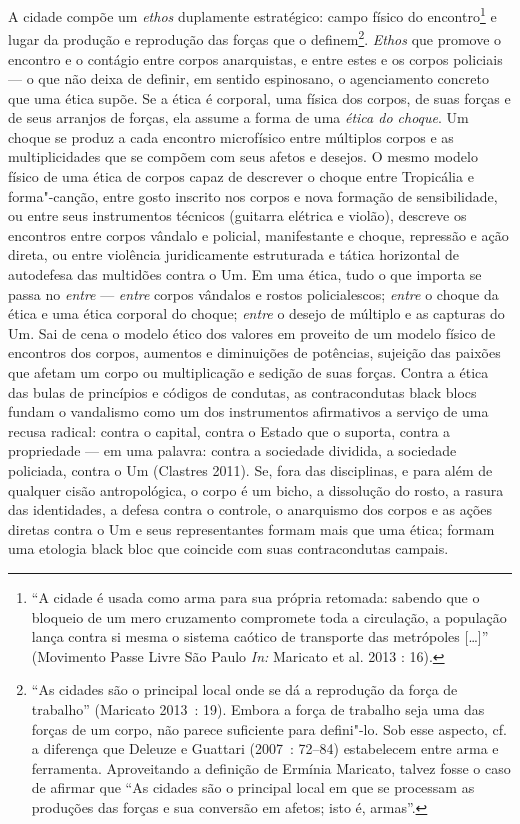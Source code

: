 A cidade compõe um \emph{ethos }duplamente estratégico: campo
físico do encontro\footnote{``A cidade é usada como
  arma para sua própria retomada: sabendo que o bloqueio de um mero
  cruzamento compromete toda a circulação, a população lança contra si
  mesma o sistema caótico de transporte das metrópoles {[}\ldots{}{]}''
  (Movimento Passe Livre São Paulo \emph{In: }Maricato et al. 2013 :
  16).} e lugar da produção e reprodução das forças que o
definem\footnote{``As cidades são o principal local
  onde se dá a reprodução da força de trabalho'' (Maricato 2013~: 19).
  Embora a força de trabalho seja uma das forças de um corpo, não parece
  suficiente para defini"-lo. Sob esse aspecto, cf. a diferença que
  Deleuze e Guattari (2007~: 72--84) estabelecem entre arma e ferramenta.
  Aproveitando a definição de Ermínia Maricato, talvez fosse o caso de
  afirmar que ``As cidades são o principal local em que se processam as
  produções das forças e sua conversão em afetos; isto é, armas''.}.
\emph{Ethos} que promove o encontro e o contágio entre corpos
anarquistas, e entre estes e os corpos policiais --- o que não deixa de
definir, em sentido espinosano, o agenciamento concreto que uma ética
supõe. Se a ética é corporal, uma física dos corpos, de suas forças e de
seus arranjos de forças, ela assume a forma de uma \emph{ética do
choque}. Um choque se produz a cada encontro microfísico entre múltiplos
corpos e as multiplicidades que se compõem com seus afetos e desejos. O
mesmo modelo físico de uma ética de corpos capaz de descrever o choque
entre Tropicália e forma"-canção, entre gosto inscrito nos corpos e nova
formação de sensibilidade, ou entre seus instrumentos técnicos (guitarra
elétrica e violão), descreve os encontros entre corpos vândalo e
policial, manifestante e choque, repressão e ação direta, ou entre
violência juridicamente estruturada e tática horizontal de autodefesa
das multidões contra o Um. Em uma ética, tudo o que importa se passa no
\emph{entre} --- \emph{entre} corpos vândalos e rostos policialescos;
\emph{entre }o choque da ética e uma ética corporal do choque;
\emph{entre} o desejo de múltiplo e as capturas do Um. Sai de cena o
modelo ético dos valores em proveito de um modelo físico de encontros
dos corpos, aumentos e diminuições de potências, sujeição das paixões
que afetam um corpo ou multiplicação e sedição de suas forças. Contra a
ética das bulas de princípios e códigos de condutas, as contracondutas
black blocs fundam o vandalismo como um dos instrumentos afirmativos a
serviço de uma recusa radical: contra o capital, contra o Estado que o
suporta, contra a propriedade --- em uma palavra: contra a sociedade
dividida, a sociedade policiada, contra o Um (Clastres 2011). Se, fora
das disciplinas, e para além de qualquer cisão antropológica, o corpo é
um bicho, a dissolução do rosto, a rasura das identidades, a defesa
contra o controle, o anarquismo dos corpos e as ações diretas contra o
Um e seus representantes formam mais que uma ética; formam uma etologia
black bloc que coincide com suas contracondutas campais.

